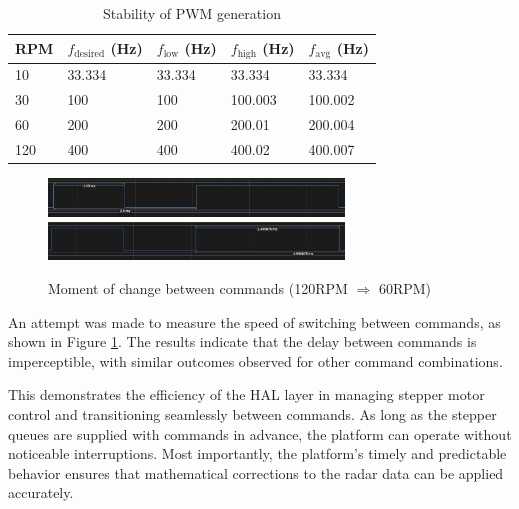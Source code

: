 \begin{table}[h!]
  \centering
  \caption[Stability of PWM generation]{Stability of PWM generation}
  \begin{tabular}{| m{2cm} || m{2.5cm} | m{2.5cm} | m{2.5cm} | m{2.5cm} |}
    \hline
    RPM & $f_{\mathrm{desired}}$ (Hz) & $f_{\mathrm{low}}$ (Hz) & $f_{\mathrm{high}}$ (Hz) & $f_\mathrm{avg}$ (Hz) \\
    \hline
    10  & 33.334                      & 33.334                  & 33.334                   & 33.334                \\
    30  & 100                         & 100                     & 100.003                  & 100.002               \\
    60  & 200                         & 200                     & 200.01                   & 200.004               \\
    120 & 400                         & 400                     & 400.02                   & 400.007               \\
    \hline
  \end{tabular}
  \label{tab:performancepwm}
\end{table}

\begin{figure}[h!]
	\centering
	\includegraphics[width=0.7\textwidth]{../img/120rpm_to60_1.jpg}
	\includegraphics[width=0.7\textwidth]{../img/120rpm_to60_2.jpg}
	\caption[Moment of change between commands with 120RPM and 60RPM]{Moment of change between commands (120RPM $\Rightarrow$  60RPM)}
	\label{fig:switching}
\end{figure}

An attempt was made to measure the speed of switching between commands, as shown in Figure \ref{fig:switching}.
The results indicate that the delay between commands is imperceptible, with similar outcomes observed for other command combinations.

This demonstrates the efficiency of the HAL layer in managing stepper motor control and transitioning seamlessly between commands.
As long as the stepper queues are supplied with commands in advance, the platform can operate without noticeable interruptions.
Most importantly, the platform’s timely and predictable behavior ensures that mathematical corrections to the radar data can be applied accurately.


